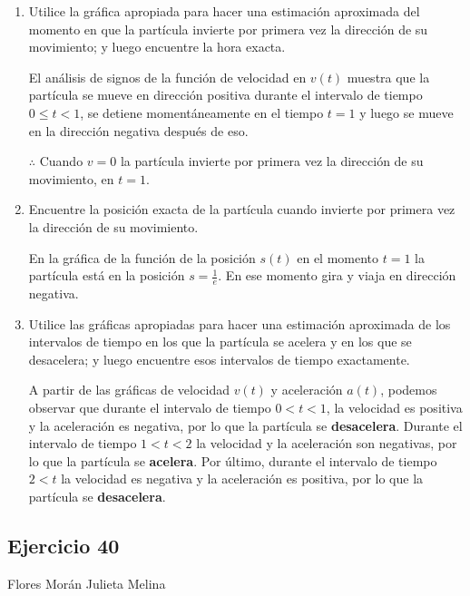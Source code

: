 \documentclass[12pt]{article}
\begin{document}
\begin{enumerate}[label=(\alph*)]
\item Utilice la gráfica apropiada para hacer una estimación aproximada del momento en que la partícula invierte por primera vez la dirección de su movimiento; y luego encuentre la hora exacta.

  El análisis de signos de la función de velocidad en $v(t)$ muestra que la partícula se mueve en dirección positiva durante el intervalo de tiempo $0 \leq t < 1$, se detiene momentáneamente en el tiempo $t = 1$ y luego se mueve en la dirección negativa después de eso.
  
  $\therefore $ Cuando $v=0$ la partícula invierte por primera vez la dirección de su movimiento, en $t=1$.
  
\item Encuentre la posición exacta de la partícula cuando invierte por primera vez la dirección de su movimiento.

  En la gráfica de la función de la posición $s(t)$ en el momento $t = 1$ la partícula está en la posición $s = \frac{1}{e}$. En ese momento gira y viaja en dirección negativa.
  
\item Utilice las gráficas apropiadas para hacer una estimación aproximada de los intervalos de tiempo en los que la partícula se acelera y en los que se desacelera; y luego encuentre esos intervalos de tiempo exactamente.

  A partir de las gráficas de velocidad $v(t)$ y aceleración $a(t)$, podemos observar que durante el intervalo de tiempo $0<t<1$, la velocidad es positiva y la aceleración es negativa, por lo que la partícula se \textbf{desacelera}. Durante el intervalo de tiempo $1<t<2$ la velocidad y la aceleración son negativas, por lo que la partícula se \textbf{acelera}. Por último, durante el intervalo de tiempo $2<t$ la velocidad es negativa y la aceleración es positiva, por lo que la partícula se \textbf{desacelera}.
  
\end{enumerate}
    
\subsection{Ejercicio 40} Flores Morán Julieta Melina \\
\end{document}
